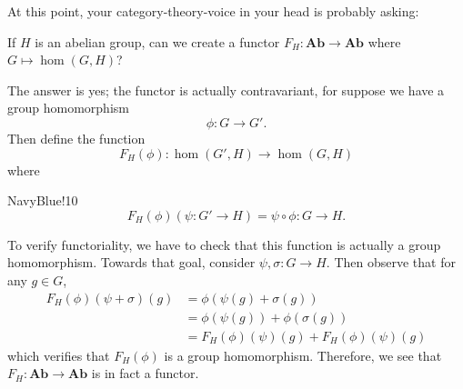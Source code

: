 At this point, your category-theory-voice in your head is probably asking:
\begin{center}
    \begin{minipage}{0.8\textwidth}
        \textcolor{NavyBlue}{If $H$ is an abelian group, can we create a functor $F_H: \textbf{Ab} \to \textbf{Ab}$ 
        where $G \mapsto \hom(G, H)$?}
    \end{minipage}
\end{center}
The answer is yes; the functor is actually contravariant, for suppose we have a group homomorphism
\[
    \phi: G \to G'.
\]
Then define the function
\[
    F_H(\phi): \hom(G', H) \to \hom(G, H) 
\]    
where
\begin{statement}{NavyBlue!10}
\[
    F_H(\phi)(\psi: G' \to H) = \psi \circ \phi: G \to H.
\]    
\end{statement}
To verify functoriality, we have to check that this function is actually a group 
homomorphism. Towards that goal, consider $\psi, \sigma: G \to H$. Then 
observe that for any $g \in G$,
\begin{align*}
    F_H(\phi)(\psi + \sigma)(g) &= \phi(\psi(g) + \sigma(g))\\
     &= \phi(\psi(g)) + \phi(\sigma(g))\\
     &= F_H(\phi)(\psi)(g) + F_H(\phi)(\psi)(g)
\end{align*}
which verifies that $F_H(\phi)$ is a group homomorphism. Therefore, we see that 
$F_H: \textbf{Ab} \to \textbf{Ab}$ is in fact a functor.

